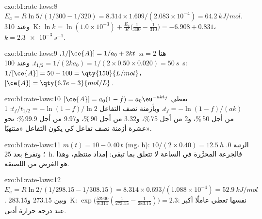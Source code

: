 \begin{solution}{exo:b1:rate-laws:8}
$E_a = R\ln5/(1/300 - 1/320) = 8.314 \times 1.609/(2.083 \times 10^{-4}) =
\qty{64.2}{kJ/mol}$. وعند \qty{310}{K}: $\ln k = \ln(1.0 \times 10^{-3}) +
\frac{E_a}{R}\big(\frac{1}{300} - \frac{1}{310}\big) = -6.908 + 0.831$،
$k = \qty{2.3e-3}{s^{-1}}$.
\end{solution}

\begin{solution}{exo:b1:rate-laws:9}
هنا $a = 2$: $1/[\ce{A}] = 1/a_0 + 2kt$، $t_{1/2} = 1/(2k a_0) = 1/(2
\times 0.50 \times 0.020) = \qty{50}{s}$. وعند \qty{100}{s}: $1/[\ce{A}] = 50
+ 100 = \qty{150}{L/mol}$، $[\ce{A}] = \qty{6.7e-3}{mol/L}$.
\end{solution}

\begin{solution}{exo:b1:rate-laws:10}
$[\ce{A}] = a_0(1 - f) = a_0\eu^{-akt_f}$ يعطي $t_f = -\ln(1-f)/(ak)$،
وبأزمنة نصف التفاعل $t_f/t_{1/2} = -\ln(1-f)/\ln2$: 1 من أجل 50\,\%، و2 من أجل 75\,\%،
و3.32 من أجل 90\,\%، و9.97 من أجل 99.9\,\%: نحو عشرة أزمنة نصف تفاعل كي يكون التفاعل
«منتهيًا».
\end{solution}

\begin{solution}{exo:b1:rate-laws:11}
$m(t) = 10 - 0.40\,t$ (\unit{mg}، \unit{h}): الرتبة 0. 
$10/(2 \times 0.40) = \qty{12.5}{h}$؛ وتفرغ بعد \qty{25}{h}. فالجرعة
المحرَّرة في الساعة لا تتعلق بما تبقى: إمداد منتظم، وهذا
هو الغرض من اللصيقة.
\end{solution}

\begin{solution}{exo:b1:rate-laws:12}
$E_a = R\ln2/(1/298.15 - 1/308.15) = 8.314 \times 0.693/(1.088 \times
10^{-4}) = \qty{52.9}{kJ/mol}$. وبين 273.15 و\qty{283.15}{K}:
$\exp\big(\frac{52900}{8.314}(\frac{1}{273.15} - \frac{1}{283.15})\big) =
2.3$:  نفسها تعطي عاملًا أكبر عند درجة حرارة
أدنى.
\end{solution}

